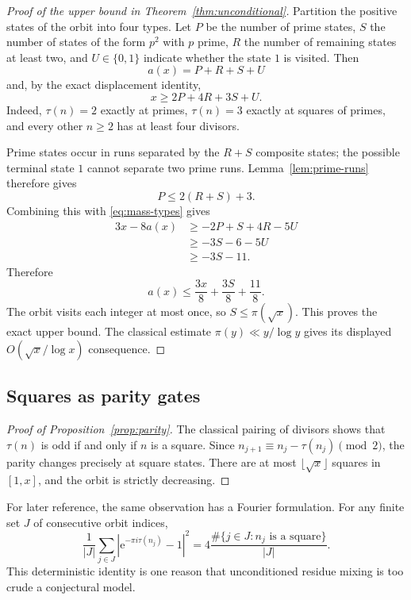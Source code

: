 \documentclass[11pt]{article}
\theoremstyle{definition}
\theoremstyle{remark}
\newcommand{\e}{\mathrm{e}}
\begin{document}
\begin{proof}[Proof of the upper bound in Theorem~\ref{thm:unconditional}]
Partition the positive states of the orbit into four types.  Let $P$ be
the number of prime states, $S$ the number of states of the form $p^2$
with $p$ prime, $R$ the number of remaining states at least two, and
$U\in\{0,1\}$ indicate whether the state $1$ is visited.  Then
\[
 a(x)=P+R+S+U
\]
and, by the exact displacement identity,
\begin{equation}\label{eq:mass-types}
 x\geq 2P+4R+3S+U.
\end{equation}
Indeed, $\tau(n)=2$ exactly at primes, $\tau(n)=3$ exactly at squares
of primes, and every other $n\geq2$ has at least four divisors.

Prime states occur in runs separated by the $R+S$ composite states;
the possible terminal state $1$ cannot separate two prime runs.
Lemma~\ref{lem:prime-runs} therefore gives
\[
 P\leq 2(R+S)+3.
\]
Combining this with \eqref{eq:mass-types} gives
\begin{align*}
 3x-8a(x)
 &\geq -2P+S+4R-5U\\
 &\geq -3S-6-5U\\
 &\geq -3S-11.
\end{align*}
Therefore
\[
 a(x)\leq\frac{3x}{8}+\frac{3S}{8}+\frac{11}{8}.
\]
The orbit visits each integer at most once, so $S\leq\pi(\sqrt x)$.
This proves the exact upper bound.  The classical estimate
$\pi(y)\ll y/\log y$ gives its displayed
$O(\sqrt x/\log x)$ consequence.
\end{proof}

\subsection{Squares as parity gates}

\begin{proof}[Proof of Proposition~\ref{prop:parity}]
The classical pairing of divisors shows that $\tau(n)$ is odd if and
only if $n$ is a square.  Since
$n_{j+1}\equiv n_j-\tau(n_j)\pmod2$, the parity changes precisely at
square states.  There are at most $\lfloor\sqrt x\rfloor$ squares in
$[1,x]$, and the orbit is strictly decreasing.
\end{proof}

For later reference, the same observation has a Fourier formulation.
For any finite set $J$ of consecutive orbit indices,
\begin{equation}\label{eq:parity-phase}
 \frac1{|J|}\sum_{j\in J}
 \left|\e^{-\pi i\tau(n_j)}-1\right|^2
 =4\frac{\#\{j\in J:n_j\text{ is a square}\}}{|J|}.
\end{equation}
This deterministic identity is one reason that unconditioned residue
mixing is too crude a conjectural model.
\end{document}
